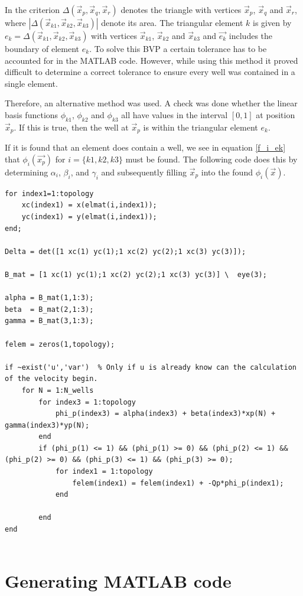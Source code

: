 \documentclass[a4paper]{report}
\begin{document}
In the criterion $\Delta(\vec{x}_p,\vec{x}_q,\vec{x}_r)$ denotes the triangle with vertices $\vec{x}_p$, $\vec{x}_q$ and $\vec{x}_r$, where $|\Delta(\vec{x}_{k1},\vec{x}_{k2},\vec{x}_{k3})|$ denote its area. The triangular element $k$ is given by $e_k=\Delta(\vec{x}_{k1},\vec{x}_{k2},\vec{x}_{k3})$ with vertices  $\vec{x}_{k1}$, $\vec{x}_{k2}$ and $\vec{x}_{k3}$ and $\vec{e_k}$ includes the boundary of element $e_k$. To solve this BVP a certain tolerance has to be accounted for in the MATLAB code. However, while using this method it proved difficult to determine a correct tolerance to ensure every well was contained in a single element.

Therefore, an alternative method was used. A check was done whether the linear basis functions $\phi_{k1}$, $\phi_{k2}$ and $\phi_{k3}$ all have values in the interval $ [0,1] $ at position $\vec{x}_p$. If this is true, then the well at $\vec{x}_p$ is within the triangular element $e_k$.

If it is found that an element does contain a well, we see in equation \eqref{f_i_ek} that $\phi_i(\vec{x_p})$ for $i = \{k1, k2, k3\}$ must be found. The following code does this by determining $\alpha_i$, $\beta_i$, and $\gamma_i $ and subsequently filling $\vec{x}_p$ into the found $\phi_i(\vec{x})$.

\begin{lstlisting}
for index1=1:topology
	xc(index1) = x(elmat(i,index1));
	yc(index1) = y(elmat(i,index1));
end;

Delta = det([1 xc(1) yc(1);1 xc(2) yc(2);1 xc(3) yc(3)]);

B_mat = [1 xc(1) yc(1);1 xc(2) yc(2);1 xc(3) yc(3)] \  eye(3);

alpha = B_mat(1,1:3);
beta  = B_mat(2,1:3);
gamma = B_mat(3,1:3);

felem = zeros(1,topology);

if ~exist('u','var')  % Only if u is already know can the calculation of the velocity begin.
	for N = 1:N_wells
		for index3 = 1:topology
			phi_p(index3) = alpha(index3) + beta(index3)*xp(N) + gamma(index3)*yp(N);
		end
		if (phi_p(1) <= 1) && (phi_p(1) >= 0) && (phi_p(2) <= 1) && (phi_p(2) >= 0) && (phi_p(3) <= 1) && (phi_p(3) >= 0);
			for index1 = 1:topology
				felem(index1) = felem(index1) + -Qp*phi_p(index1); 
			end

		end
end


\end{lstlisting}


\section{Generating MATLAB code}
\end{document}
